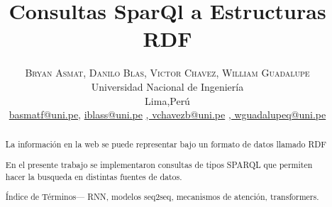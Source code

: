 \documentclass[conference]{IEEEtran}
\begin{document}
\title{\bf{Consultas SparQl a Estructuras RDF}}

\begin{comment}
\author{\IEEEauthorblockN{Asmat Franco, Bryan}
\IEEEauthorblockA{\textit{Universidad Nacional de Ingeniería} \\
Lima, Perú \\
\texttt{basmatf@uni.pe}}
\and
\IEEEauthorblockN{Blas Salas, Israel}
\IEEEauthorblockA{\textit{Universidad Nacional de Ingeniería} \\
Lima, Perú \\
\texttt{iblass@uni.pe}}
\and
\IEEEauthorblockN{Chavez Bruno, Victor}
\IEEEauthorblockA{\textit{Universidad Nacional de Ingeniería} \\
Lima, Perú \\
\texttt{vchavezb@uni.pe}}
\and
\IEEEauthorblockN{Guadalupe Quispe, William}
\IEEEauthorblockA{\textit{Universidad Nacional de Ingenieri\'a} \\
Lima, Perú \\
\texttt{wguadalupeq@uni.pe}}
}
\end{comment}
\author{%
\textsc{Bryan Asmat}\textsc{, Danilo Blas}\textsc{, Victor Chavez}\textsc{, William Guadalupe}\\
\normalsize Universidad Nacional de Ingeniería \\ %
\normalsize Lima,Perú \\ %
\normalsize \href{mailto:basmatf@uni.pe}{basmatf@uni.pe},  \href{mailto:iblass@uni.pe}{iblass@uni.pe} \href{mailto:vchavezb@uni.pe}{,  vchavezb@uni.pe} \href{mailto:wguadalupeq@uni.pe}{,  wguadalupeq@uni.pe} %
}





\maketitle

\begin{abstract}
La información en la web se puede representar bajo un formato de datos llamado RDF

En el presente trabajo se implementaron consultas de tipos SPARQL que permiten hacer la busqueda en distintas fuentes de datos.

\vspace{0.2cm}


\'Indice de T\'erminos— RNN, modelos seq2seq, mecanismos de atenci\'on, transformers.
    
\end{abstract}
\end{document}
